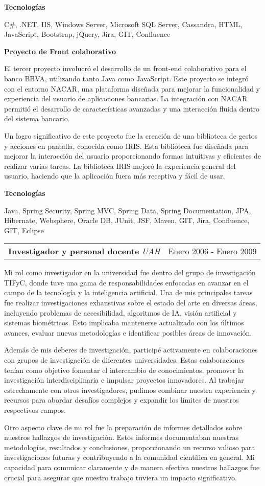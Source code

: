 \documentclass[a4paper,10pt]{article}
\makeatletter
\newcommand{\cvsubsection}[3]{
  \begin{tcolorbox}[colback=gray!20, colframe=gray!20, boxrule=0pt, arc=0mm, outer arc=0mm, width=\dimexpr\textwidth-2mm\relax, boxsep=0pt, left=2mm, right=2mm, top=2mm, bottom=2mm]
    \begin{tabular*}{\dimexpr\textwidth-6mm\relax}{p{0.7\textwidth} @{\extracolsep{\fill}} p{0.3\textwidth}}
      \raggedright
      \textbf{#1} \textit{#2} & \raggedleft \small{#3}
    \end{tabular*}
  \end{tcolorbox}
  \vspace{2mm}
}
\newcommand{\cvsubsubsection}[1]{
\begin{tcolorbox}[colback=gray!10, colframe=gray!10, boxrule=0pt, arc=0mm, outer arc=0mm, width=\textwidth, boxsep=0pt, left=4mm, right=4mm, top=1mm, bottom=1mm]
  \textbf{#1}
\end{tcolorbox}
\vspace{1mm}
}
\newcommand{\cvsubsubsubsection}[1]{
  \begin{tcolorbox}[colback=gray!5, colframe=gray!5, boxrule=0pt, arc=0mm, outer arc=0mm, width=\textwidth, boxsep=0pt, left=6mm, right=6mm, top=1mm, bottom=1mm]
    \textbf{#1}
  \end{tcolorbox}
  \vspace{1mm}
}
\makeatother
\begin{document}
\cvsubsubsubsection{Tecnologías}
C\#, .NET, IIS, Windows Server, Microsoft SQL Server, Cassandra, HTML, JavaScript, Bootstrap, jQuery, Jira, GIT, Confluence

\cvsubsubsection{Proyecto de Front colaborativo}
El tercer proyecto involucró el desarrollo de un front-end colaborativo para el banco BBVA, utilizando tanto Java como JavaScript. Este proyecto se integró con el entorno NACAR, una plataforma diseñada para mejorar la funcionalidad y experiencia del usuario de aplicaciones bancarias. La integración con NACAR permitió el desarrollo de características avanzadas y una interacción fluida dentro del sistema bancario.

Un logro significativo de este proyecto fue la creación de una biblioteca de gestos y acciones en pantalla, conocida como IRIS. Esta biblioteca fue diseñada para mejorar la interacción del usuario proporcionando formas intuitivas y eficientes de realizar varias tareas. La biblioteca IRIS mejoró la experiencia general del usuario, haciendo que la aplicación fuera más receptiva y fácil de usar.

\cvsubsubsubsection{Tecnologías}
Java, Spring Security, Spring MVC, Spring Data, Spring Documentation, JPA, Hibernate, Websphere, Oracle DB, JUnit, JSF, Maven, GIT, Jira, Confluence, GIT, Eclipse

\cvsubsection{Investigador y personal docente}{UAH}{Enero 2006 - Enero 2009}
Mi rol como investigador en la universidad fue dentro del grupo de investigación TIFyC, donde tuve una gama de responsabilidades enfocadas en avanzar en el campo de la tecnología y la inteligencia artificial. Una de mis principales tareas fue realizar investigaciones exhaustivas sobre el estado del arte en diversas áreas, incluyendo problemas de accesibilidad, algoritmos de IA, visión artificial y sistemas biométricos. Esto implicaba mantenerse actualizado con los últimos avances, evaluar nuevas metodologías e identificar posibles áreas de innovación.

Además de mis deberes de investigación, participé activamente en colaboraciones con grupos de investigación de diferentes universidades. Estas colaboraciones tenían como objetivo fomentar el intercambio de conocimientos, promover la investigación interdisciplinaria e impulsar proyectos innovadores. Al trabajar estrechamente con otros investigadores, pudimos combinar nuestra experiencia y recursos para abordar desafíos complejos y expandir los límites de nuestros respectivos campos.

Otro aspecto clave de mi rol fue la preparación de informes detallados sobre nuestros hallazgos de investigación. Estos informes documentaban nuestras metodologías, resultados y conclusiones, proporcionando un recurso valioso para investigaciones futuras y contribuyendo a la comunidad científica en general. Mi capacidad para comunicar claramente y de manera efectiva nuestros hallazgos fue crucial para asegurar que nuestro trabajo tuviera un impacto significativo.
\end{document}
